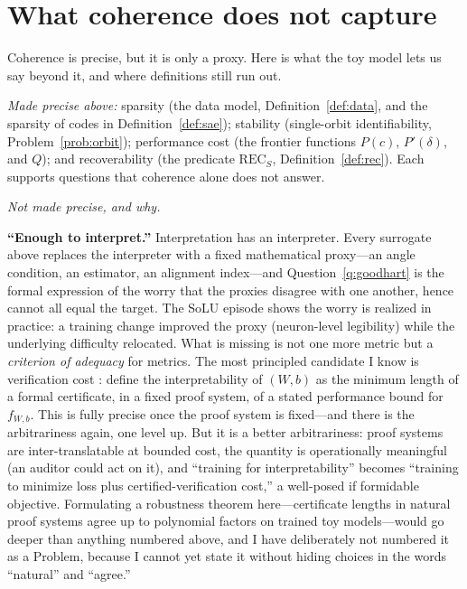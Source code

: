 \documentclass[11pt]{amsart}
\theoremstyle{plain}
\theoremstyle{definition}
\begin{document}
\section{What coherence does not capture}\label{sec:resist}

Coherence is precise, but it is only a proxy. Here is what the toy model lets us say beyond it, and where definitions still run out.

\emph{Made precise above:} sparsity (the data model, Definition~\ref{def:data}, and the sparsity of codes in Definition~\ref{def:sae}); stability (single-orbit identifiability, Problem~\ref{prob:orbit}); performance cost (the frontier functions $P(c)$, $P'(\delta)$, and $Q$); and recoverability (the predicate $\mathrm{REC}_S$, Definition~\ref{def:rec}). Each supports questions that coherence alone does not answer.

\emph{Not made precise, and why.}

\textbf{``Enough to interpret.''} Interpretation has an interpreter. Every surrogate above replaces the interpreter with a fixed mathematical proxy---an angle condition, an estimator, an alignment index---and Question~\ref{q:goodhart} is the formal expression of the worry that the proxies disagree with one another, hence cannot all equal the target. The SoLU episode \cite{elhage2022solu} shows the worry is realized in practice: a training change improved the proxy (neuron-level legibility) while the underlying difficulty relocated. What is missing is not one more metric but a \emph{criterion of adequacy} for metrics. The most principled candidate I know is verification cost \cite{gross2024}: define the interpretability of $(W,b)$ as the minimum length of a formal certificate, in a fixed proof system, of a stated performance bound for $f_{W,b}$. This is fully precise once the proof system is fixed---and there is the arbitrariness again, one level up. But it is a better arbitrariness: proof systems are inter-translatable at bounded cost, the quantity is operationally meaningful (an auditor could act on it), and ``training for interpretability'' becomes ``training to minimize loss plus certified-verification cost,'' a well-posed if formidable objective. Formulating a robustness theorem here---certificate lengths in natural proof systems agree up to polynomial factors on trained toy models---would go deeper than anything numbered above, and I have deliberately not numbered it as a Problem, because I cannot yet state it without hiding choices in the words ``natural'' and ``agree.''
\end{document}
